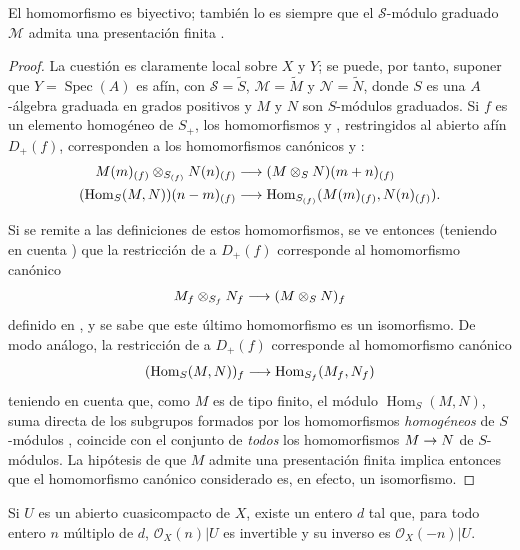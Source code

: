 \documentclass[oneside,10pt]{amsart}
\makeatletter
\newcommand{\ega@arrow}[2]{\mathchoice{#1}{#2}{#2}{#2}}
\renewcommand{\to}{\ega@arrow{\longrightarrow}{\rightarrow}}
\let\EGAOriginalLabel\label
\renewcommand{\label}[1]{\phantomsection\EGAOriginalLabel{#1}}
\makeatother
\begin{document}
\begin{proposition}[8.14.3]
\label{II.8.14.3-fr}
El homomorfismo  es biyectivo;
también lo es  siempre que el $\mathcal{S}$-módulo graduado $\mathcal{M}$ admita una presentación finita .
\end{proposition}

\begin{proof}
La cuestión es claramente local sobre $X$ y $Y$;
se puede, por tanto, suponer que $Y=\operatorname{Spec}(A)$ es afín, con $\mathcal{S}=\widetilde{S}$, $\mathcal{M}=\widetilde{M}$ y $\mathcal{N}=\widetilde{N}$, donde $S$ es una $A$-álgebra graduada en grados positivos y $M$ y $N$ son $S$-módulos graduados.
Si $f$ es un elemento homogéneo de $S_+$, los homomorfismos  y , restringidos al abierto afín $D_+(f)$, corresponden a los homomorfismos canónicos  y :
\begin{align*}
  M(m)_{(f)}\otimes_{S_{(f)}}N(n)_{(f)}
  &\to(M\otimes_S N)(m+n)_{(f)}\\
  (\operatorname{Hom}_S(M,N))(n-m)_{(f)}
  &\to\operatorname{Hom}_{S_{(f)}}(M(m)_{(f)},N(n)_{(f)}).
\end{align*}

Si se remite a las definiciones de estos homomorfismos, se ve entonces (teniendo en cuenta ) que la restricción de  a $D_+(f)$ corresponde al homomorfismo canónico
\[
  M_f\otimes_{S_f}N_f\to(M\otimes_S N)_f
\]
definido en , y se sabe que este último homomorfismo es un isomorfismo.
De modo análogo, la restricción de  a $D_+(f)$ corresponde al homomorfismo canónico 
\[
  (\operatorname{Hom}_S(M,N))_f\to
  \operatorname{Hom}_{S_f}(M_f,N_f)
\]
teniendo en cuenta que, como $M$ es de tipo finito, el módulo $\operatorname{Hom}_S(M,N)$, suma directa de los subgrupos formados por los homomorfismos \emph{homogéneos} de $S$-módulos , coincide con el conjunto de \emph{todos} los homomorfismos $M\to N$ de $S$-módulos.
La hipótesis de que $M$ admite una presentación finita implica entonces  que el homomorfismo canónico considerado es, en efecto, un isomorfismo.
\end{proof}

\begin{proposition}[8.14.4]
\label{II.8.14.4-fr}
Si $U$ es un abierto cuasicompacto de $X$, existe un entero $d$ tal que, para todo entero $n$ múltiplo de $d$, $\mathcal{O}_X(n)|U$ es invertible y su inverso es $\mathcal{O}_X(-n)|U$.
\end{proposition}
\end{document}
